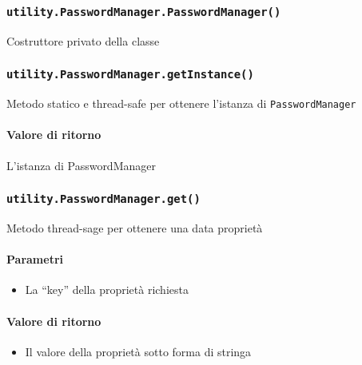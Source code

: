 \subsubsection{\texttt{utility.PasswordManager.PasswordManager()}}
Costruttore privato della classe

\subsubsection{\texttt{utility.PasswordManager.getInstance()}}
Metodo statico e thread-safe per ottenere l'istanza di \texttt{PasswordManager}
\paragraph{Valore di ritorno}
L'istanza di PasswordManager

\subsubsection{\texttt{utility.PasswordManager.get()}}
Metodo thread-sage per ottenere una data proprietà
\paragraph{Parametri}
\begin{itemize}
\item La ``key'' della proprietà richiesta
\end{itemize}
\paragraph{Valore di ritorno}
\begin{itemize}
\item Il valore della proprietà sotto forma di stringa
\end{itemize}
  
